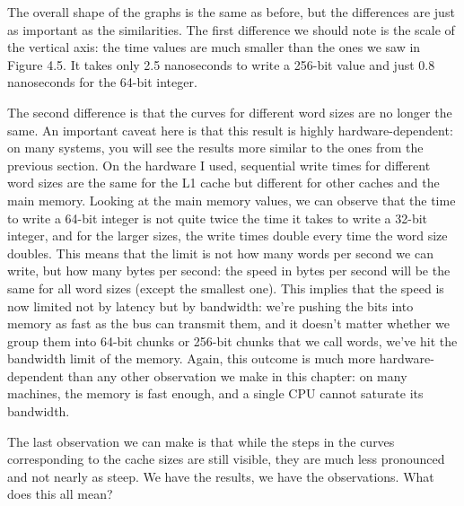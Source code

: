The overall shape of the graphs is the same as before, but the differences are just as important as the similarities. The first difference we should note is the scale of the vertical axis: the time values are much smaller than the ones we saw in Figure 4.5. It takes only 2.5 nanoseconds to write a 256-bit value and just 0.8 nanoseconds for the 64-bit integer.

The second difference is that the curves for different word sizes are no longer the same. An important caveat here is that this result is highly hardware-dependent: on many systems, you will see the results more similar to the ones from the previous section. On the hardware I used, sequential write times for different word sizes are the same for the L1 cache but different for other caches and the main memory. Looking at the main memory values, we can observe that the time to write a 64-bit integer is not quite twice the time it takes to write a 32-bit integer, and for the larger sizes, the write times double every time the word size doubles. This means that the limit is not how many words per second we can write, but how many bytes per second: the speed in bytes per second will be the same for all word sizes (except the smallest one). This implies that the speed is now limited not by latency but by bandwidth: we're pushing the bits into memory as fast as the bus can transmit them, and it doesn't matter whether we group them into 64-bit chunks or 256-bit chunks that we call words, we've hit the bandwidth limit of the memory. Again, this outcome is much more hardware-dependent than any other observation we make in this chapter: on many machines, the memory is fast enough, and a single CPU cannot saturate its bandwidth.

The last observation we can make is that while the steps in the curves corresponding to the cache sizes are still visible, they are much less pronounced and not nearly as steep. We have the results, we have the observations. What does this all mean?



